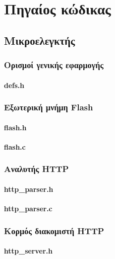 \chapter{Πηγαίος κώδικας}

\section{Μικροελεγκτής}


\subsection*{Ορισμοί γενικής εφαρμογής}
\subsubsection*{defs.h}



\subsection*{Εξωτερική μνήμη Flash}
\subsubsection*{flash.h}

\subsubsection*{flash.c}



\subsection*{Αναλυτής HTTP}
\subsubsection*{http\_parser.h}

\subsubsection*{http\_parser.c}



\subsection*{Κορμός διακομιστή HTTP}
\subsubsection*{http\_server.h}

